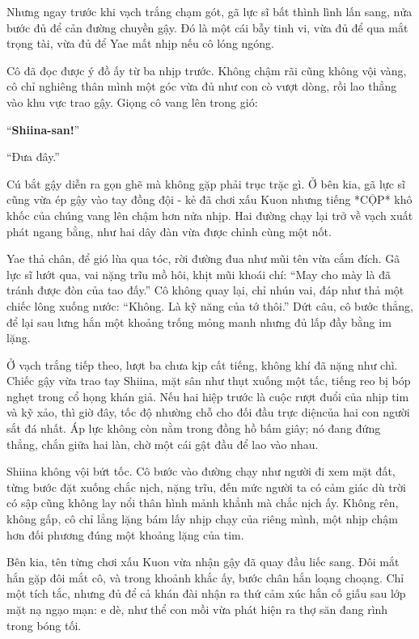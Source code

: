 \documentclass[../main.tex]{subfiles}
\begin{document}
Nhưng ngay trước khi vạch trắng chạm gót, gã lực sĩ bất thình lình lấn sang, nửa bước đủ để cản đường chuyền gậy. Đó là một cái bẫy tinh vi, vừa đủ để qua mắt trọng tài, vừa đủ để Yae mất nhịp nếu cô lóng ngóng.

Cô đã đọc được ý đồ ấy từ ba nhịp trước. Không chậm rãi cũng không vội vàng, cô chỉ nghiêng thân mình một góc vừa đủ như con cò vượt dòng, rồi lao thẳng vào khu vực trao gậy. Giọng cô vang lên trong gió:

``\textbf{Shiina-san!}''

``Đưa đây.''

Cú bắt gậy diễn ra gọn ghẽ mà không gặp phải trục trặc gì. Ở bên kia, gã lực sĩ cũng vừa ép gậy vào tay đồng đội - kẻ đã chơi xấu Kuon nhưng tiếng *CỘP* khô khốc của chúng vang lên chậm hơn nửa nhịp. Hai đường chạy lại trở về vạch xuất phát ngang bằng, như hai dây đàn vừa được chỉnh cùng một nốt.

Yae thả chân, để gió lùa qua tóc, rời đường đua như mũi tên vừa cắm đích. Gã lực sĩ lướt qua, vai nặng trĩu mồ hôi, khịt mũi khoái chí: ``May cho mày là đã tránh được đòn của tao đấy.'' Cô không quay lại, chỉ nhún vai, đáp như thả một chiếc lông xuống nước: ``Không. Là kỹ năng của tớ thôi.'' Dứt câu, cô bước thẳng, để lại sau lưng hắn một khoảng trống mỏng manh nhưng đủ lấp đầy bằng im lặng.

Ở vạch trắng tiếp theo, lượt ba chưa kịp cất tiếng, không khí đã nặng như chì. Chiếc gậy vừa trao tay Shiina, mặt sân như thụt xuống một tấc, tiếng reo bị bóp nghẹt trong cổ họng khán giả. Nếu hai hiệp trước là cuộc rượt đuổi của nhịp tim và kỹ xảo, thì giờ đây, tốc độ nhường chỗ cho đối đầu trực diệncủa hai con người sắt đá nhất. Áp lực không còn nằm trong đồng hồ bấm giây; nó đang đứng thẳng, chắn giữa hai làn, chờ một cái gật đầu để lao vào nhau.

Shiina không vội bứt tốc. Cô bước vào đường chạy như người đi xem mặt đất, từng bước đặt xuống chắc nịch, nặng trĩu, đến mức người ta có cảm giác dù trời có sập cũng không lay nổi thân hình mảnh khẳnh mà chắc nịch ấy. Không rên, không gấp, cô chỉ lẳng lặng bám lấy nhịp chạy của riêng mình, một nhịp chậm hơn đối phương đúng một khoảng lặng của tim.

Bên kia, tên từng chơi xấu Kuon vừa nhận gậy đã quay đầu liếc sang. Đôi mắt hắn gặp đôi mắt cô, và trong khoảnh khắc ấy, bước chân hắn loạng choạng. Chỉ một tích tắc, nhưng đủ để cả khán đài nhận ra thứ cảm xúc hắn cố giấu sau lớp mặt nạ ngạo mạn: e dè, như thể con mồi vừa phát hiện ra thợ săn đang rình trong bóng tối.
\end{document}
